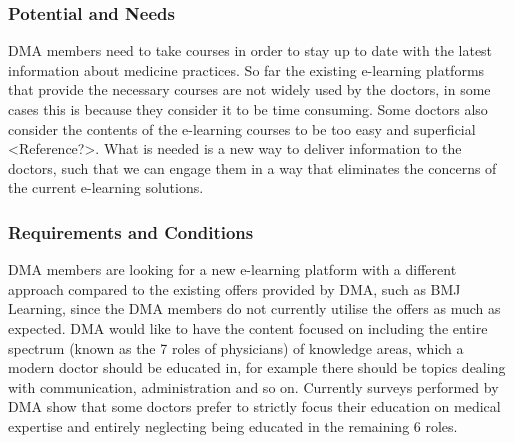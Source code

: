 \subsubsection{Potential and Needs}
DMA members need to take courses in order to stay up to date with the latest information about medicine practices. So far the existing e-learning platforms that provide the necessary courses are not widely used by the doctors, in some cases this is because they consider it to be time consuming. Some doctors also consider the contents of the e-learning courses to be too easy and superficial <Reference?>. What is needed is a new way to deliver information to the doctors, such that we can engage them in a way that eliminates the concerns of the current e-learning solutions.


\subsubsection{Requirements and Conditions}
DMA members are looking for a new e-learning platform with a different approach compared to the existing offers provided by DMA, such as BMJ Learning, since the DMA members do not currently utilise the offers as much as expected. DMA would like to have the content focused on including the entire spectrum (known as the 7 roles of physicians) of knowledge areas, which a modern doctor should be educated in, for example there should be topics dealing with communication, administration and so on. Currently surveys performed by DMA show that some doctors prefer to strictly focus their education on medical expertise and entirely neglecting being educated in the remaining 6 roles.

